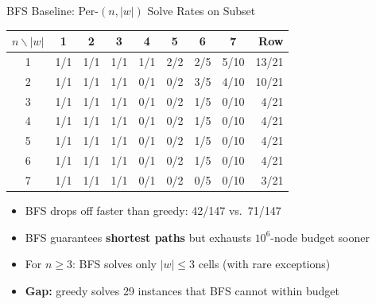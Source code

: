 \documentclass[aspectratio=169,11pt]{beamer}
\begin{document}
\begin{frame}{BFS Baseline: Per-$(n, |w|)$ Solve Rates on Subset}
  \footnotesize
  \begin{center}
  \begin{tabular}{c|ccccccc|r}
    \toprule
    $n \backslash |w|$ & 1 & 2 & 3 & 4 & 5 & 6 & 7 & \textbf{Row} \\
    \midrule
    1 & \cellcolor{good!30}1/1 & \cellcolor{good!30}1/1 & \cellcolor{good!30}1/1 & \cellcolor{good!30}1/1 & \cellcolor{good!30}2/2 & \cellcolor{bad!15}2/5 & \cellcolor{bad!15}5/10 & 13/21 \\
    2 & \cellcolor{good!30}1/1 & \cellcolor{good!30}1/1 & \cellcolor{good!30}1/1 & \cellcolor{bad!20}0/1 & \cellcolor{bad!30}0/2 & \cellcolor{bad!15}3/5 & \cellcolor{bad!15}4/10 & 10/21 \\
    3 & \cellcolor{good!30}1/1 & \cellcolor{good!30}1/1 & \cellcolor{good!30}1/1 & \cellcolor{bad!20}0/1 & \cellcolor{bad!30}0/2 & \cellcolor{bad!20}1/5 & \cellcolor{bad!30}0/10 & 4/21 \\
    4 & \cellcolor{good!30}1/1 & \cellcolor{good!30}1/1 & \cellcolor{good!30}1/1 & \cellcolor{bad!20}0/1 & \cellcolor{bad!30}0/2 & \cellcolor{bad!20}1/5 & \cellcolor{bad!30}0/10 & 4/21 \\
    5 & \cellcolor{good!30}1/1 & \cellcolor{good!30}1/1 & \cellcolor{good!30}1/1 & \cellcolor{bad!20}0/1 & \cellcolor{bad!30}0/2 & \cellcolor{bad!20}1/5 & \cellcolor{bad!30}0/10 & 4/21 \\
    6 & \cellcolor{good!30}1/1 & \cellcolor{good!30}1/1 & \cellcolor{good!30}1/1 & \cellcolor{bad!20}0/1 & \cellcolor{bad!30}0/2 & \cellcolor{bad!20}1/5 & \cellcolor{bad!30}0/10 & 4/21 \\
    7 & \cellcolor{good!30}1/1 & \cellcolor{good!30}1/1 & \cellcolor{good!30}1/1 & \cellcolor{bad!20}0/1 & \cellcolor{bad!30}0/2 & \cellcolor{bad!30}0/5 & \cellcolor{bad!30}0/10 & 3/21 \\
    \bottomrule
  \end{tabular}
  \end{center}

  \bigskip
  \begin{itemize}
    \item BFS drops off faster than greedy: 42/147 vs.\ 71/147
    \item BFS guarantees \textbf{shortest paths} but exhausts $10^6$-node budget sooner
    \item For $n \ge 3$: BFS solves only $|w| \le 3$ cells (with rare exceptions)
    \item \textbf{Gap:} greedy solves 29 instances that BFS cannot within budget
  \end{itemize}
\end{frame}
\end{document}
